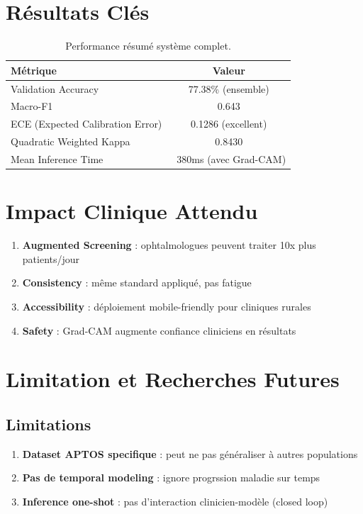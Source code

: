 \documentclass[12pt,a4paper,oneside]{report}
\begin{document}
\section{Résultats Clés}

\begin{table}[H]
\centering
\begin{tabular}{|l|c|}
\hline
\textbf{Métrique} & \textbf{Valeur} \\
\hline
Validation Accuracy & 77.38\% (ensemble) \\
Macro-F1 & 0.643 \\
ECE (Expected Calibration Error) & 0.1286 (excellent) \\
Quadratic Weighted Kappa & 0.8430 \\
Mean Inference Time & ~380ms (avec Grad-CAM) \\
\hline
\end{tabular}
\caption{Performance résumé système complet.}
\label{tab:final_summary}
\end{table}

\section{Impact Clinique Attendu}

\begin{enumerate}
    \item \textbf{Augmented Screening} : ophtalmologues peuvent 
          traiter 10x plus patients/jour
    \item \textbf{Consistency} : même standard appliqué, pas fatigue
    \item \textbf{Accessibility} : déploiement mobile-friendly pour 
          cliniques rurales
    \item \textbf{Safety} : Grad-CAM augmente confiance cliniciens 
          en résultats
\end{enumerate}

\section{Limitation et Recherches Futures}

\subsection{Limitations}

\begin{enumerate}
    \item \textbf{Dataset APTOS specifique} : peut ne pas généraliser 
          à autres populations
    \item \textbf{Pas de temporal modeling} : ignore progrssion 
          maladie sur temps
    \item \textbf{Inference one-shot} : pas d'interaction 
          clinicien-modèle (closed loop)
\end{enumerate}
\end{document}
